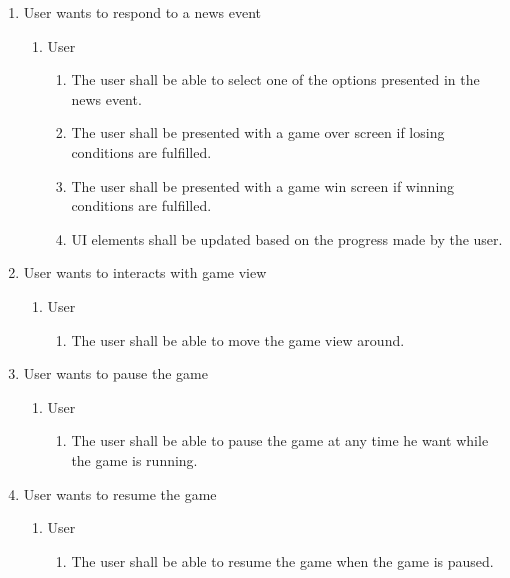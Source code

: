\documentclass[]{article}
\begin{document}
\begin{enumerate}[{BE}1.]
    \item User wants to respond to a news event
    \begin{enumerate}[{VP1}.1]
      \item User
      \begin{enumerate}
        \item The user shall be able to select one of the options presented in the news event.
        \item The user shall be presented with a game over screen if losing conditions are fulfilled.
        \item The user shall be presented with a game win screen if winning conditions are fulfilled.
        \item UI elements shall be updated based on the progress made by the user.
      \end{enumerate}
    \end{enumerate}

    \item User wants to interacts with game view
    \begin{enumerate}[{VP1}.1]
      \item User
      \begin{enumerate}
        \item The user shall be able to move the game view around.
      \end{enumerate}
    \end{enumerate}

    \item User wants to pause the game
    \begin{enumerate}[{VP1}.1]
      \item User
      \begin{enumerate}
        \item The user shall be able to pause the game at any time he want while the game is running.
      \end{enumerate}
    \end{enumerate}

    \item User wants to resume the game
    \begin{enumerate}[{VP1}.1]
      \item User
      \begin{enumerate}
        \item The user shall be able to resume the game when the game is paused.
      \end{enumerate}
    \end{enumerate}


\end{enumerate}
\end{document}

